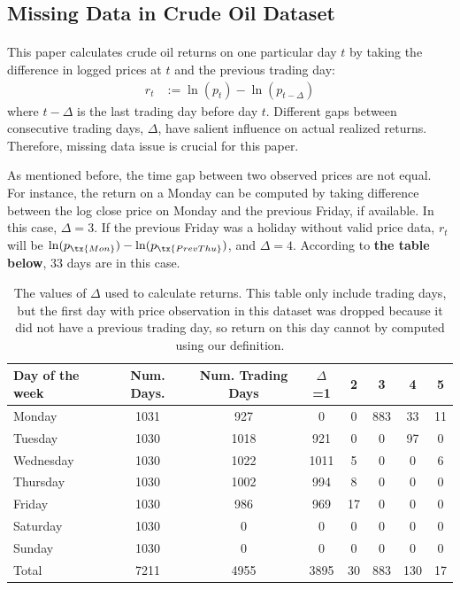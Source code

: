\documentclass[12pt]{article}
\begin{document}
	\subsection{Missing Data in Crude Oil Dataset}

	\paragraph{} This paper calculates crude oil returns on one particular day $t$ by taking the difference in logged prices at $t$ and the previous trading day:
	\begin{align}
		r_t &:= \ln(p_t) - \ln(p_{t - \Delta})
	\end{align}
	where $t - \Delta$ is the last trading day before day $t$. Different gaps between consecutive trading days, $\Delta$, have salient influence on actual realized returns. Therefore, missing data issue is crucial for this paper.
	\par As mentioned before, the time gap between two observed prices are not equal. For instance, the return on a Monday can be computed by taking difference between the log close price on Monday and the previous Friday, if available. In this case, $\Delta = 3$. If the previous Friday was a holiday without valid price data, $r_t$ will be $\ln(p_\tx{Mon}) - \ln(p_{\tx{Prev Thu}})$, and $\Delta = 4$. According to \textbf{the table below}, 33 days are in this case.
	\begin{table}[H]
		\centering
		\small
		\begin{tabular}{l|c c c c c c c}
			\toprule
			Day of the week & Num. Days. & Num. Trading Days & $\Delta$=1 & 2 & 3 & 4 & 5 \\
			\midrule
			Monday & 1031 & 927 & 0 & 0 & 883 & 33 & 11 \\
			Tuesday & 1030 & 1018 & 921 & 0 & 0 & 97 & 0 \\
			Wednesday & 1030 & 1022 & 1011 & 5 & 0 & 0 & 6 \\
			Thursday & 1030 & 1002 & 994 & 8 & 0 & 0 & 0 \\
			Friday & 1030 & 986 & 969 & 17 & 0 & 0 & 0 \\
			Saturday & 1030 & 0 & 0 & 0 & 0 & 0 & 0 \\
			Sunday & 1030 & 0 & 0 & 0 & 0 & 0 & 0 \\
			\midrule
			Total & 7211 & 4955 & 3895 & 30 & 883 & 130 & 17 \\
			\bottomrule
		\end{tabular}
		\caption{The values of $\Delta$ used to calculate returns. This table only include trading days, but the first day with price observation in this dataset was dropped because it did not have a previous trading day, so return on this day cannot by computed using our definition.}
	\end{table}
\end{document}
